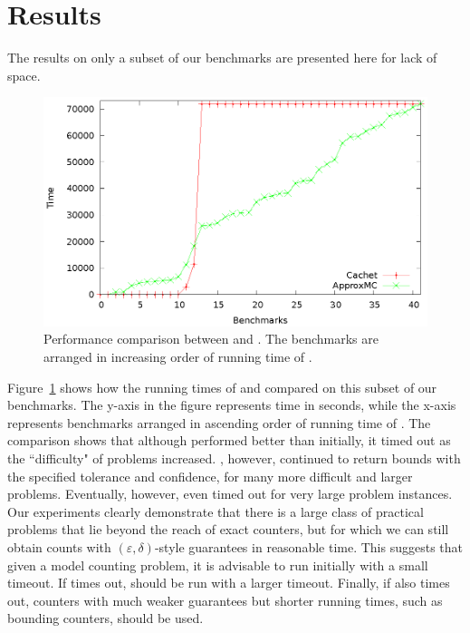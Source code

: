 \section{Results}
\label{sec:results}
The results on only a subset of our benchmarks are presented here for
lack of space.  
\begin{figure}[h!b]
\centering
\includegraphics[scale=0.7]{time.eps}
\caption{Performance comparison between {\ApproxMC} and {\Cachet}. The
  benchmarks are arranged in increasing order of running time of
  {\ApproxMC}.}
\label{fig:perfomance_comparisons}
\end{figure}
Figure~\ref{fig:perfomance_comparisons} shows how the running times of
{\ApproxMC} and {\Cachet} compared on this subset of our benchmarks.  The
y-axis in the figure represents time in seconds, while the x-axis
represents benchmarks arranged in ascending order of running time of
{\ApproxMC}.  The comparison shows that although {\Cachet} performed
better than {\ApproxMC} initially, it timed out as the ``difficulty"
of problems increased.  {\ApproxMC}, however, continued to return
bounds with the specified tolerance and confidence, for many more
difficult and larger problems.  Eventually, however, even {\ApproxMC}
timed out for very large problem instances.  Our experiments clearly
demonstrate that there is a large class of practical problems that lie
beyond the reach of exact counters, but for which we can still obtain
counts with $(\varepsilon, \delta)$-style guarantees in reasonable
time.  This suggests that given a model counting problem, it is
advisable to run {\Cachet} initially with a small timeout.  If
{\Cachet} times out, {\ApproxMC} should be run with a larger timeout.
Finally, if {\ApproxMC} also times out, counters with much weaker
guarantees but shorter running times, such as bounding counters,
should be used.

